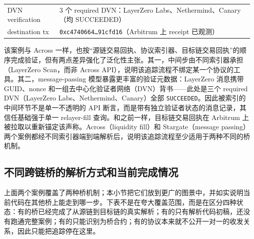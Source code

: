 \documentclass[12pt,a4paper]{ctexart}
\begin{document}
\begin{longtable}[]{@{}ll@{}}
\begin{minipage}[t]{0.47\columnwidth}
DVN verification\strut
\end{minipage} & \begin{minipage}[t]{0.47\columnwidth}\raggedright
3 个 required DVN：LayerZero Labs、Nethermind、Canary（均
SUCCEEDED）\strut
\end{minipage}\tabularnewline
\begin{minipage}[t]{0.47\columnwidth}\raggedright
destination tx\strut
\end{minipage} & \begin{minipage}[t]{0.47\columnwidth}\raggedright
\texttt{0xc4740664\ldots{}91cfd16}（Arbitrum 上 receipt 已观测）\strut
\end{minipage}\tabularnewline
\bottomrule
\end{longtable}

该案例与 Across
一样，也按``源链交易回执、协议索引器、目标链交易回执''的顺序完成验证，但有两点差异强化了泛化性主张。其一，中间步由不同索引器承担（LayerZero
Scan，而非 Across
API），说明该追踪流程不绑定某一个协议的工具。其二，message-passing
模型暴露更丰富的验证元数据：LayerZero 消息携带 GUID、nonce
和一组去中心化验证者网络（DVN）背书------此处是三个 required
DVN（LayerZero Labs、Nethermind、Canary）全部
\texttt{SUCCEEDED}。因此被索引的中间环节不是单一不透明的 API
断言，而是带有独立验证者状态的消息记录，其信任基础强于单一 relayer-fill
查询。和之前一样，目标链交易回执在 Arbitrum
上被拉取以重新锚定该声称。Across（liquidity fill）和 Stargate（message
passing）两个案例都经不同索引器端到端解析后，说明该追踪流程至少适用于两种不同的桥机制。

\hypertarget{cross-bridge-cases-and-current-status}{%
\subsection{不同跨链桥的解析方式和当前完成情况}\label{cross-bridge-cases-and-current-status}}

上面两个案例覆盖了两种桥机制；本小节把它们放到更广的图景中，并如实说明当前代码在其他桥上能走到哪一步。下表不是在夸大覆盖范围，而是在区分四种状态：有的桥已经完成了从源链到目标链的真实解析；有的只有解析代码初稿，还没有跑通完整案例；有的只能识别为桥合约；有的协议本来就不公开一对一的收发关系，因此只能把追踪停在这里。
\end{document}
